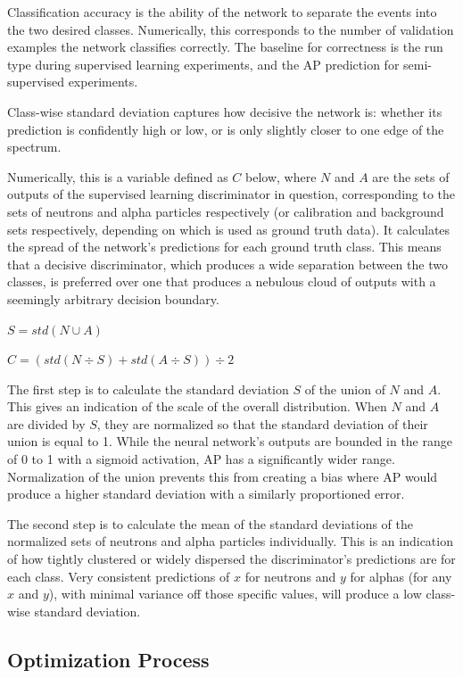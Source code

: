 \documentclass[10pt]{article}
\begin{document}
Classification accuracy is the ability of the network to separate the events into the two desired classes. Numerically, this corresponds to the number of validation examples the network classifies correctly. The baseline for correctness is the run type during supervised learning experiments, and the AP prediction for semi-supervised experiments.

Class-wise standard deviation captures how decisive the network is: whether its prediction is confidently high or low, or is only slightly closer to one edge of the spectrum.

Numerically, this is a variable defined as $C$ below, where $N$ and $A$ are the sets of outputs of the supervised learning discriminator in question, corresponding to the sets of neutrons and alpha particles respectively (or calibration and background sets respectively, depending on which is used as ground truth data). It calculates the spread of the network's predictions for each ground truth class. This means that a decisive discriminator, which produces a wide separation between the two classes, is preferred over one that produces a nebulous cloud of outputs with a seemingly arbitrary decision boundary.

$S=std(N \cup A)$

$C=(std(N \div S) + std(A \div S)) \div 2$

The first step is to calculate the standard deviation $S$ of the union of $N$ and $A$. This gives an indication of the scale of the overall distribution. When $N$ and $A$ are divided by $S$, they are normalized so that the standard deviation of their union is equal to 1. While the neural network’s outputs are bounded in the range of 0 to 1 with a sigmoid activation, AP has a significantly wider range. Normalization of the union prevents this from creating a bias where AP would produce a higher standard deviation with a similarly proportioned error.

The second step is to calculate the mean of the standard deviations of the normalized sets of neutrons and alpha particles individually. This is an indication of how tightly clustered or widely dispersed the discriminator’s predictions are for each class. Very consistent predictions of $x$ for neutrons and $y$ for alphas (for any $x$ and $y$), with minimal variance off those specific values, will produce a low class-wise standard deviation.

\subsection{Optimization Process}
\end{document}

